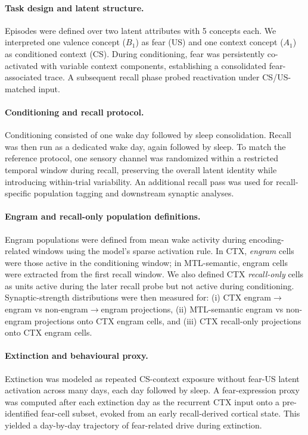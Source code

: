 \documentclass{article}
\begin{document}
\paragraph{Task design and latent structure.}
Episodes were defined over two latent attributes with 5 concepts each. We interpreted one valence concept ($B_1$) as fear (US) and one context concept ($A_1$) as conditioned context (CS). During conditioning, fear was persistently co-activated with variable context components, establishing a consolidated fear-associated trace. A subsequent recall phase probed reactivation under CS/US-matched input.

\paragraph{Conditioning and recall protocol.}
Conditioning consisted of one wake day followed by sleep consolidation. Recall was then run as a dedicated wake day, again followed by sleep. To match the reference protocol, one sensory channel was randomized within a restricted temporal window during recall, preserving the overall latent identity while introducing within-trial variability. An additional recall pass was used for recall-specific population tagging and downstream synaptic analyses.

\paragraph{Engram and recall-only population definitions.}
Engram populations were defined from mean wake activity during encoding-related windows using the model's sparse activation rule. In CTX, \emph{engram} cells were those active in the conditioning window; in MTL-semantic, engram cells were extracted from the first recall window. We also defined CTX \emph{recall-only} cells as units active during the later recall probe but not active during conditioning. Synaptic-strength distributions were then measured for: (i) CTX engram$\rightarrow$engram vs non-engram$\rightarrow$engram projections, (ii) MTL-semantic engram vs non-engram projections onto CTX engram cells, and (iii) CTX recall-only projections onto CTX engram cells.

\paragraph{Extinction and behavioural proxy.}
Extinction was modeled as repeated CS-context exposure without fear-US latent activation across many days, each day followed by sleep. A fear-expression proxy was computed after each extinction day as the recurrent CTX input onto a pre-identified fear-cell subset, evoked from an early recall-derived cortical state. This yielded a day-by-day trajectory of fear-related drive during extinction.
\end{document}
